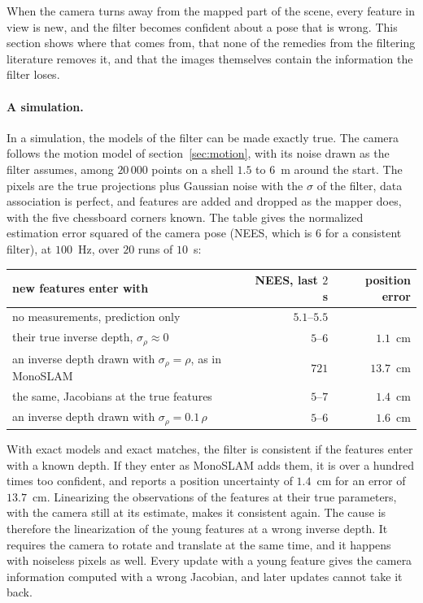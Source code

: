 \documentclass[11pt]{article}
\begin{document}
When the camera turns away from the mapped part of the scene, every feature in view is new, and
the filter becomes confident about a pose that is wrong. This section shows where that comes from,
that none of the remedies from the filtering literature removes it, and that the images themselves
contain the information the filter loses.

\paragraph{A simulation.}
In a simulation, the models of the filter can be made exactly true. The camera follows the motion
model of section~\ref{sec:motion}, with its noise drawn as the filter assumes, among $20\,000$
points on a shell $1.5$ to $6$~m around the start. The pixels are the true projections plus
Gaussian noise with the $\sigma$ of the filter, data association is perfect, and features are added
and dropped as the mapper does, with the five chessboard corners known. The table gives the
normalized estimation error squared of the camera pose (NEES, which is $6$ for a consistent
filter), at $100$~Hz, over $20$ runs of $10$~s:

\begin{center}
\begin{tabular}{lrr}
  new features enter with & NEES, last $2$~s & position error \\
  \hline
  no measurements, prediction only & $5.1$--$5.5$ & \\
  their true inverse depth, $\sigma_\rho \approx 0$ & $5$--$6$ & $1.1$~cm \\
  an inverse depth drawn with $\sigma_\rho = \rho$, as in MonoSLAM & $721$ & $13.7$~cm \\
  the same, Jacobians at the true features & $5$--$7$ & $1.4$~cm \\
  an inverse depth drawn with $\sigma_\rho = 0.1\, \rho$ & $5$--$6$ & $1.6$~cm \\
\end{tabular}
\end{center}

With exact models and exact matches, the filter is consistent if the features enter with a known
depth. If they enter as MonoSLAM adds them, it is over a hundred times too confident, and reports
a position uncertainty of $1.4$~cm for an error of $13.7$~cm. Linearizing the observations of the
features at their true parameters, with the camera still at its estimate, makes it consistent
again. The cause is therefore the linearization of the young features at a wrong inverse depth. It
requires the camera to rotate and translate at the same time, and it happens with noiseless pixels
as well. Every update with a young feature gives the camera information computed with a wrong
Jacobian, and later updates cannot take it back.
\end{document}
